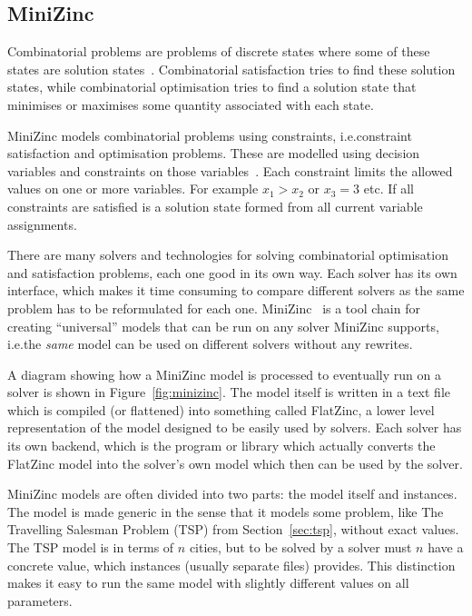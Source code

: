 \documentclass[a4paper,12pt]{article}
\begin{document}
\subsection{MiniZinc}\label{sec:mzn}

Combinatorial problems are problems of discrete states where some of these states are
solution states~\cite{combopt}. Combinatorial satisfaction tries to find these solution states,
while combinatorial optimisation tries to find a solution state that minimises or
maximises some quantity associated with each state.

MiniZinc models combinatorial problems using constraints, i.e.\@ constraint satisfaction
and optimisation problems. These are modelled using decision variables and
constraints on those variables~\cite{constraintshandbook}. Each constraint limits the
allowed values on one or more variables.
For example $x_1 > x_2$ or $x_3 = 3$ etc. If all constraints are satisfied is a
solution state formed from all current variable assignments.

There are many solvers and technologies for solving combinatorial optimisation and
satisfaction problems, each one good in its own way. Each solver
has its own interface, which makes it time consuming to compare different
solvers as the same problem has to be reformulated for each one. MiniZinc~\cite{MiniZinc}
is a tool chain for creating ``universal'' models that can be run on any solver MiniZinc
supports, i.e.\@ the \emph{same} model can be used on different solvers without any
rewrites.

A diagram showing how a MiniZinc model is processed to eventually run on a
solver is shown in Figure~\ref{fig:minizinc}. The model itself is written in a text file
which is compiled (or flattened) into something called FlatZinc, a lower level
representation of the model designed to be easily used by solvers. Each
solver has its own backend, which is the program or library which actually converts the
FlatZinc model into the solver's own model which then can be used by the solver.



MiniZinc models are often divided into two parts: the model itself and instances. The
model is made generic in the sense that it models some problem, like The Travelling
Salesman Problem (TSP) from
Section~\ref{sec:tsp}, without exact values. The TSP model is in terms of $n$ cities, but
to be solved by a solver must $n$ have a concrete value, which instances (usually separate
files) provides. This distinction makes it easy to run the same model with slightly
different values on all parameters.
\end{document}
